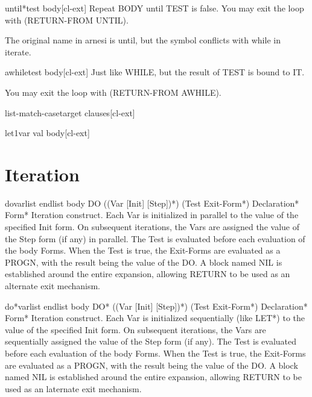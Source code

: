 \documentclass[10pt,english]{book}
\begin{document}
\begin{macro}{until*}{test \body body}[cl-ext]
  Repeat BODY until TEST is false. You may exit the loop with
  (RETURN-FROM UNTIL).
  \begin{devnote}
    The original name in arnesi is until, but the symbol conflicts
    with while in iterate.
  \end{devnote}
\end{macro}

\begin{macro}{awhile}{test \body body}[cl-ext]
  Just like WHILE, but the result of TEST is bound to IT.

You may exit the loop with (RETURN-FROM AWHILE).
\end{macro}

\begin{macro}{list-match-case}{target \body clauses}[cl-ext]
  
\end{macro}

\begin{macro}{let1}{var val \body body}[cl-ext]
  
\end{macro}




\chapter{Iteration}
\label{cha:iteration}

\begin{macro}{do}{varlist endlist \body body}
  DO ({(Var [Init] [Step])}*) (Test Exit-Form*) Declaration* Form*
  Iteration construct. Each Var is initialized in parallel to the value of the
  specified Init form. On subsequent iterations, the Vars are assigned the
  value of the Step form (if any) in parallel. The Test is evaluated before
  each evaluation of the body Forms. When the Test is true, the Exit-Forms
  are evaluated as a PROGN, with the result being the value of the DO. A block
  named NIL is established around the entire expansion, allowing RETURN to be
  used as an alternate exit mechanism.
\end{macro}

\begin{macro}{do*}{varlist endlist \body body}
  DO* ({(Var [Init] [Step])}*) (Test Exit-Form*) Declaration* Form*
  Iteration construct. Each Var is initialized sequentially (like LET*) to the
  value of the specified Init form. On subsequent iterations, the Vars are
  sequentially assigned the value of the Step form (if any). The Test is
  evaluated before each evaluation of the body Forms. When the Test is true,
  the Exit-Forms are evaluated as a PROGN, with the result being the value
  of the DO. A block named NIL is established around the entire expansion,
  allowing RETURN to be used as an laternate exit mechanism.
\end{macro}
\end{document}
